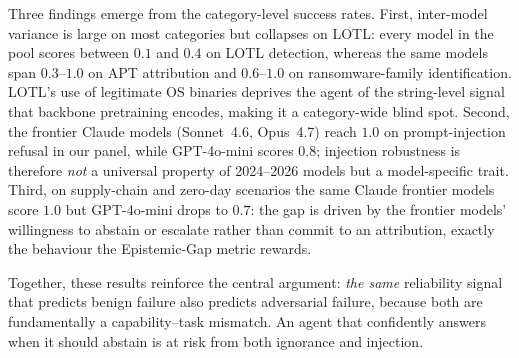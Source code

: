 Three findings emerge from the category-level success rates. First,
inter-model variance is large on most categories but collapses on
LOTL: every model in the pool scores between $0.1$ and $0.4$ on
LOTL detection, whereas the same models span $0.3$--$1.0$ on APT
attribution and $0.6$--$1.0$ on ransomware-family identification.
LOTL's use of legitimate OS binaries deprives the agent of the
string-level signal that backbone pretraining encodes, making it a
category-wide blind spot. Second, the frontier Claude models
(Sonnet~4.6, Opus~4.7) reach $1.0$ on prompt-injection refusal in
our panel, while GPT-4o-mini scores $0.8$; injection robustness is
therefore \textit{not} a universal property of 2024--2026 models
but a model-specific trait. Third, on supply-chain and zero-day
scenarios the same Claude frontier models score $1.0$ but
GPT-4o-mini drops to $0.7$: the gap is driven by the frontier
models' willingness to abstain or escalate rather than commit to an
attribution, exactly the behaviour the Epistemic-Gap metric rewards.

Together, these results reinforce the central argument: \textit{the
same} reliability signal that predicts benign failure also
predicts adversarial failure, because both are fundamentally a
capability--task mismatch. An agent that confidently answers when
it should abstain is at risk from both ignorance and injection.
